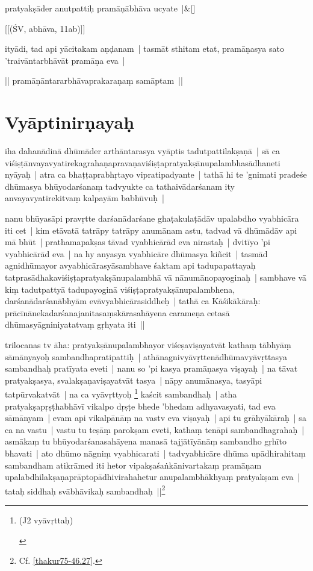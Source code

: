 \documentclass[article,a4paper]{memoir}
\newcommand{\persName}[1]{#1}
\begin{document}
	    
	    \stanza[\smallbreak]
pratyakṣā\-der anutpattiḥ pramā\-ṇā\-bhā\-va ucyate |\&[\smallbreak]


	[[(ŚV, abhā\-va, 11ab)]]

	  \pstart ityā\-di, tad api yā\-citakam aṇḍanam | tasmā\-t sthitam etat, pramā\-ṇasya sato 'traivā\-ntarbhā\-vā\-t pramā\-ṇa eva |
	\pend
      

	  \pstart || pramā\-ṇā\-ntararbhā\-vaprakaraṇaṃ samā\-ptam || 
	\pend
      
	  
	
\section[{Vyā\-ptinirṇayaḥ}]{Vyā\-ptinirṇayaḥ}\label{Vyāptinirṇayaḥ}

	  \pstart iha dahanā\-dinā\- dhū\-mā\-der arthā\-ntarasya vyā\-ptis tadutpattilakṣaṇā\- | sā\- ca viśiṣṭā\-nvayavyatirekagrahaṇapravaṇaviśiṣṭapratyakṣā\-nupalambhasā\-dhaneti nyā\-yaḥ | atra ca bhaṭṭaprabhṛtayo vipratipadyante | tathā\- hi te 'gnimati pradeśe dhū\-masya bhū\-yodarśanaṃ tadvyukte ca tathaivā\-darśanam ity anvayavyatirekitvaṃ kalpayā\-m babhū\-vuḥ | 
	\pend
      

	  \pstart nanu bhū\-yasā\-pi pravṛtte darśanā\-darśane ghaṭakulaṭā\-dā\-v upalabdho vyabhicā\-ra iti cet | kim etā\-vatā\- tatrā\-py tatrā\-py anumā\-nam astu, tadvad vā\- dhū\-mā\-dā\-v api mā\- bhū\-t | prathamapakṣas tā\-vad vyabhicā\-rā\-d eva nirastaḥ | dvitī\-yo 'pi vyabhicā\-rā\-d eva | na hy anyasya vyabhicā\-re dhū\-masya kiñcit | tasmā\-d agnidhū\-mayor avyabhicā\-rasyā\-sambhave śaktam api tadupapattayaḥ tatprasā\-dhakaviśiṣṭapratyakṣā\-nupalambhā\- vā\- nā\-numā\-nopayoginaḥ | sambhave vā\- kiṃ tadutpattyā\- tadupayoginā\- viśiṣṭapratyakṣā\-nupalambhena, darśanā\-darśanā\-bhyā\-m evā\-vyabhicā\-rasiddheḥ | tathā\- ca Kā\-śikā\-kā\-raḥ: prā\-cī\-nā\-nekadarśanajanitasaṃskā\-rasahā\-yena carameṇa cetasā\- dhū\-masyā\-gniniyatatvaṃ gṛhyata iti ||
	\pend
      

	  \pstart \persName{trilocanas} tv ā\-ha: pratyakṣā\-nupalambhayor viśeṣaviṣayatvā\-t kathaṃ tā\-bhyā\-ṃ sā\-mā\-nyayoḥ sambandhapratipattiḥ | athā\-nagnivyā\-vṛttenā\-dhū\-mavyā\-vṛttasya sambandhaḥ pratī\-yata eveti | nanu so 'pi kasya pramā\-ṇasya viṣayaḥ | na tā\-vat pratyakṣasya, svalakṣaṇaviṣayatvā\-t tasya | nā\-py anumā\-nasya, tasyā\-pi tatpū\-rvakatvā\-t | na ca vyā\-vṛttyoḥ \footnote{\begin{english}(J2 vyā\-vṛttaḥ)\end{english}} kaścit sambandhaḥ | atha pratyakṣapṛṣṭhabhā\-vī\- vikalpo dṛṣṭe bhede 'bhedam adhyavasyati, tad eva sā\-mā\-nyam | evam api vikalpā\-nā\-ṃ na vastv eva viṣayaḥ | api tu grā\-hyā\-kā\-raḥ | sa ca na vastu | vastu tu teṣā\-ṃ parokṣam eveti, kathaṃ tenā\-pi sambandhagrahaḥ | asmā\-kaṃ tu bhū\-yodarśanasahā\-yena manasā\- tajjā\-tī\-yā\-nā\-ṃ sambandho gṛhī\-to bhavati | ato dhū\-mo nā\-gniṃ vyabhicarati | tadvyabhicā\-re dhū\-ma upā\-dhirahitaṃ sambandham atikrā\-med iti hetor vipakṣaśaṅkā\-nivartakaṃ pramā\-ṇam upalabdhilakṣaṇaprā\-ptopā\-dhivirahahetur anupalambhā\-khyaṃ pratyakṣam eva | tataḥ siddhaḥ svā\-bhā\-vikaḥ sambandhaḥ ||\footnote{Cf. \cref{thakur75-46.27}.}
	\pend
      
\end{document}
